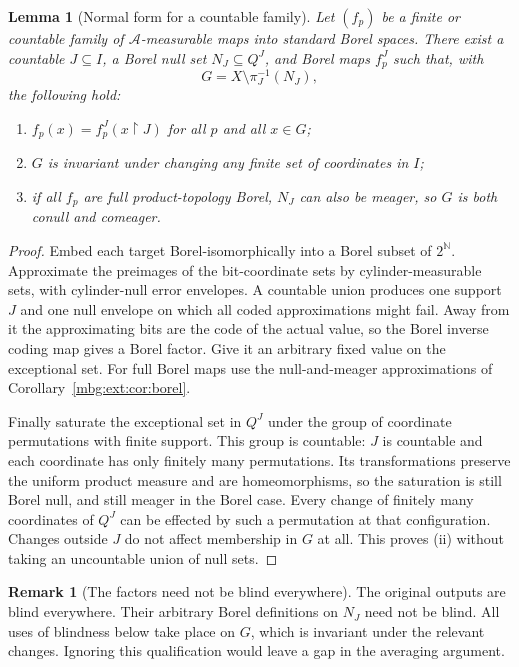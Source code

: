 \documentclass[11pt,letterpaper]{article}
\newtheorem{lemma}[theorem]{Lemma}
\theoremstyle{definition}
\newtheorem{remark}[theorem]{Remark}
\newcommand{\N}{\mathbb N}
\newcommand{\restr}{\mathbin{\upharpoonright}}
\newcommand{\A}{\mathcal A}
\begin{document}
\begin{lemma}[Normal form for a countable family]
\label{mbg:ext:lem:normal}
Let $(f_p)$ be a finite or countable family of $\A$-measurable maps into standard Borel spaces. There exist a countable $J\subseteq I$, a Borel null set $N_J\subseteq Q^J$, and Borel maps $f_p^J$ such that, with
\[
G=X\setminus\pi_J^{-1}(N_J),
\]
the following hold:
\begin{enumerate}[label=(\roman*)]
\item $f_p(x)=f_p^J(x\restr J)$ for all $p$ and all $x\in G$;
\item $G$ is invariant under changing any finite set of coordinates in $I$;
\item if all $f_p$ are full product-topology Borel, $N_J$ can also be meager, so $G$ is both conull and comeager.
\end{enumerate}
\end{lemma}
\begin{proof}
Embed each target Borel-isomorphically into a Borel subset of $2^\N$. Approximate the preimages of the bit-coordinate sets by cylinder-measurable sets, with cylinder-null error envelopes. A countable union produces one support $J$ and one null envelope on which all coded approximations might fail. Away from it the approximating bits are the code of the actual value, so the Borel inverse coding map gives a Borel factor. Give it an arbitrary fixed value on the exceptional set. For full Borel maps use the null-and-meager approximations of Corollary~\ref{mbg:ext:cor:borel}.

Finally saturate the exceptional set in $Q^J$ under the group of coordinate permutations with finite support. This group is countable: $J$ is countable and each coordinate has only finitely many permutations. Its transformations preserve the uniform product measure and are homeomorphisms, so the saturation is still Borel null, and still meager in the Borel case. Every change of finitely many coordinates of $Q^J$ can be effected by such a permutation at that configuration. Changes outside $J$ do not affect membership in $G$ at all. This proves (ii) without taking an uncountable union of null sets.
\end{proof}

\begin{remark}[The factors need not be blind everywhere]
The original outputs are blind everywhere. Their arbitrary Borel definitions on $N_J$ need not be blind. All uses of blindness below take place on $G$, which is invariant under the relevant changes. Ignoring this qualification would leave a gap in the averaging argument.
\end{remark}
\end{document}
